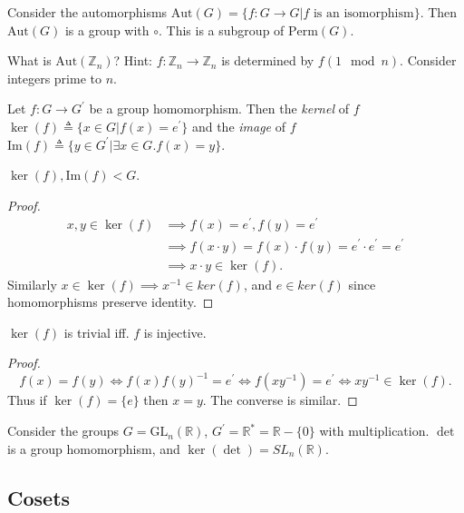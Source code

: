 \documentclass{article}
\begin{document}
Consider the automorphisms 
$\mathrm{Aut}(G) = \{f : G \to G | f \text{ is an isomorphism}\}$.
Then $\mathrm{Aut}(G)$ is a group with $\circ$. This is a subgroup
of $\mathrm{Perm}(G)$.

\begin{exer}
What is $\mathrm{Aut}(\mathbb{Z}_n)$? 
Hint: $f : \mathbb{Z}_n \to \mathbb{Z}_n$ is determined by $f(1 \mod n)$.
Consider integers prime to $n$.
\end{exer}

\begin{defn}
Let $f: G \to G^\prime$ be a group homomorphism. Then the \emph{kernel} of
$f$ $\ker(f) \triangleq \{ x \in G | f(x) = e^\prime \}$ and the \emph{image} of $f$
$\mathrm{Im}(f) \triangleq \{ y \in G^\prime | \exists x \in G . f(x) = y \}$.
\end{defn}

\begin{prop}
$\ker(f), \mathrm{Im}(f) < G$.
\end{prop}
\begin{proof}
\begin{align*}
  x, y \in \ker(f) 
    & \implies f(x) = e^\prime, f(y) = e^\prime \\
    & \implies f(x \cdot y) = f(x) \cdot f(y)   
                            = e^\prime \cdot e^\prime 
                            = e^\prime          \\
    & \implies x \cdot y \in \ker(f).
\end{align*}
Similarly $x \in \ker(f) \implies x^{-1} \in ker(f)$,
and $e \in ker(f)$ since homomorphisms preserve identity.
\end{proof}

\begin{prop}
$\ker(f)$ is trivial iff. $f$ is injective.
\end{prop}
\begin{proof}
$$
f(x) = f(y) \iff f(x) f(y)^{-1} = e^\prime 
            \iff f(xy^{-1}) = e^\prime 
            \iff xy^{-1} \in \ker(f).
$$
Thus if $\ker(f) = \{ e \}$ then $x = y$. The converse is similar.
\end{proof}

\begin{xmpl}
Consider the groups
$G = \mathrm{GL}_n (\mathbb{R})$, 
$G^\prime = \mathbb{R}^\ast = \mathbb{R} - \{0\}$ with multiplication.
$\det$ is a group homomorphism, and $\ker(\det) = SL_n(\mathbb{R})$.
\end{xmpl}

\subsection{Cosets}
\end{document}
